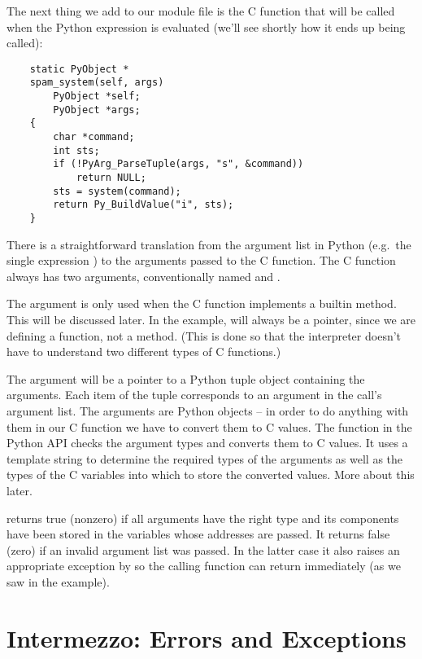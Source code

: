 The next thing we add to our module file is the C function that will
be called when the Python expression 
is evaluated (we'll see shortly how it ends up being called):

\begin{verbatim}
    static PyObject *
    spam_system(self, args)
        PyObject *self;
        PyObject *args;
    {
        char *command;
        int sts;
        if (!PyArg_ParseTuple(args, "s", &command))
            return NULL;
        sts = system(command);
        return Py_BuildValue("i", sts);
    }
\end{verbatim}

There is a straightforward translation from the argument list in
Python (e.g.\ the single expression ) to the arguments
passed to the C function.  The C function always has two arguments,
conventionally named  and .

The  argument is only used when the C function implements a
builtin method.  This will be discussed later. In the example,
 will always be a  pointer, since we are defining
a function, not a method.  (This is done so that the interpreter
doesn't have to understand two different types of C functions.)

The  argument will be a pointer to a Python tuple object
containing the arguments.  Each item of the tuple corresponds to an
argument in the call's argument list.  The arguments are Python
objects -- in order to do anything with them in our C function we have
to convert them to C values.  The function 
in the Python API checks the argument types and converts them to C
values.  It uses a template string to determine the required types of
the arguments as well as the types of the C variables into which to
store the converted values.  More about this later.

 returns true (nonzero) if all arguments have
the right type and its components have been stored in the variables
whose addresses are passed.  It returns false (zero) if an invalid
argument list was passed.  In the latter case it also raises an
appropriate exception by so the calling function can return
 immediately (as we saw in the example).


\section{Intermezzo: Errors and Exceptions}

